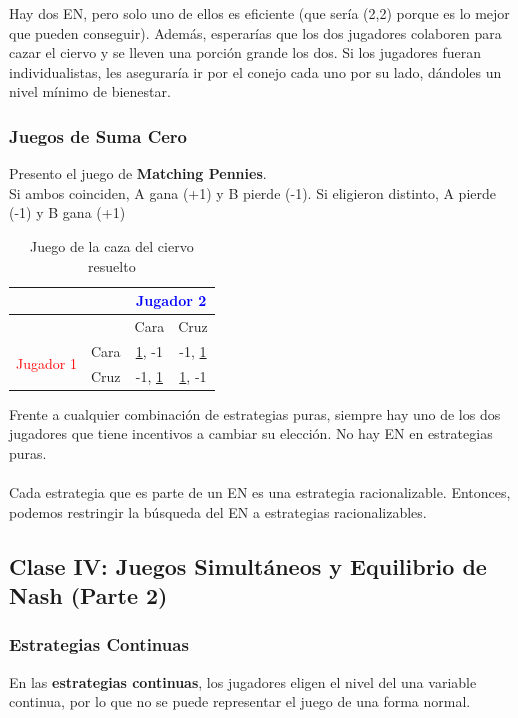 \documentclass{article}
\newcommand{\ulcolor}[2][Red]{\setulcolor{#1}\ul{#2}}
\begin{document}
                Hay dos EN, pero solo uno de ellos es eficiente (que sería (2,2) porque es lo mejor que pueden conseguir). Además, esperarías que los dos jugadores colaboren para cazar el ciervo y se lleven una porción grande los dos. Si los jugadores fueran individualistas, les aseguraría ir por el conejo cada uno por su lado, dándoles un nivel mínimo de bienestar.
            \subsubsection*{Juegos de Suma Cero}
                Presento el juego de \textbf{Matching Pennies}. \\
                Si ambos coinciden, A gana (+1) y B pierde (-1). Si eligieron distinto, A pierde (-1) y B gana (+1)
                \begin{table}[H]
                    \centering
                        \begin{tabular}{|c|c|c|c|}
                        \hline
                        & & \multicolumn{2}{c|}{\textcolor{Blue}{Jugador 2}} \\ \hline
                                                & & Cara & Cruz \\ \hline
                        \multirow{2}{*}{\textcolor{Red}{Jugador 1}} 
                                                & Cara & \ulcolor[Red]{1}, -1 & -1, \ulcolor[Blue]{1} \\ \cline{2-4} 
                                                & Cruz & -1, \ulcolor[Blue]{1} & \ulcolor[Red]{1}, -1 \\ \hline
                        \end{tabular}
                    \caption{Juego de la caza del ciervo resuelto}
                \end{table}
                Frente a cualquier combinación de estrategias puras, siempre hay uno de los dos jugadores que tiene incentivos a cambiar su elección. No hay EN en estrategias puras. \\
                \\
                Cada estrategia que es parte de un EN es una estrategia racionalizable. Entonces, podemos restringir la búsqueda del EN a estrategias racionalizables.
        \subsection*{Clase IV: Juegos Simultáneos y Equilibrio de Nash (Parte 2)}
            \subsubsection*{Estrategias Continuas}
                En las \textbf{estrategias continuas}, los jugadores eligen el nivel del una variable continua, por lo que no se puede representar el juego de una forma normal. 
\end{document}
